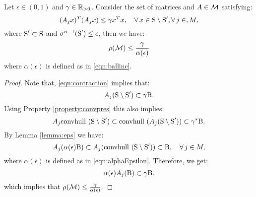 \begin{lemma}\label{lemma:epsilon1}Let $\epsilon \in (0, 1)$ and $\gamma \in \mathbb{R}_{> 0}$. Consider the set of matrices and $A \in \mathcal{M}$ satisfying:
\begin{equation}\label{eqn:contraction}(A_jx)^T(A_jx) \leq \gamma x^Tx, \quad \forall\, x \in \text{S} \setminus \text{S}', \forall\,j \in, M,\end{equation}
where $\text{S}' \subset \text{S}$ and $\sigma^{n-1}(\text{S}') \leq \epsilon$, then we have:
\begin{equation*}
\rho(\mathcal{M}) \leq \frac{\gamma}{\alpha(\epsilon)}
\end{equation*}
where $\alpha(\epsilon)$ is defined as in \eqref{eqn:ballinc}.
\end{lemma}

\begin{proof}Note that, \eqref{eqn:contraction} implies that:
$$A_j (\text{S} \setminus \text{S}') \subset \gamma \text{B}.$$
Using Property \ref{property:convpres} this also implies:
$$A_j \mbox{convhull }(\text{S} \setminus \text{S}') \subset \mbox{convhull }(A_j(\text{S} \setminus \text{S}')) \subset \gamma^* \text{B} .$$
By Lemma \ref{lemma:eps} we have:
$$A_j (\alpha(\epsilon) \text{B}) \subset A_j (\mbox{convhull } (\text{S} \setminus \text{S}')) \subset \text{B}, \quad  \forall\, j \in M,$$
where $\alpha(\epsilon)$ is defined as in \eqref{eqn:alphaEpsilon}. Therefore, we get:
$$\alpha(\epsilon) A_j (\text{B}) \subset \gamma\text{B}.$$
which implies that $\rho(\mathcal{M}) \leq \frac{\gamma}{\alpha(\epsilon)}.$
\end{proof}




